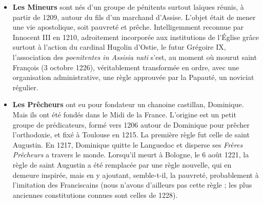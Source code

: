 \documentclass[french,twoside]{book} %
\begin{document}
\begin{itemize}[itemsep=0pt,]
\item {\bfseries Les Mineurs} sont nés d’un groupe de pénitents surtout laïques réunis, à partir de 1209, autour du fils d’un marchand d’Assise. L’objet était de mener une vie apostolique, soit pauvreté et prêche. Intelligemment reconnue par Innocent III en 1210, adroitement incorporée aux institutions de l’Église grâce surtout à l’action du cardinal Hugolin d’Ostie, le futur Grégoire IX, l’association des {\itshape poenitentes in Assisia nati} s’est, au moment où mourut saint François (3 octobre 1226), véritablement transformée en ordre, avec une organisation administrative, une règle approuvée par la Papauté, un noviciat régulier.
\item {\bfseries Les Prêcheurs} ont eu pour fondateur un chanoine castillan, Dominique. Mais ils ont été fondés dans le Midi de la France.  
\label{p111} L’origine est un petit groupe de prédicateurs, formé vers 1206 autour de Dominique pour prêcher l’orthodoxie, et fixé à Toulouse en 1215. La première règle fut celle de saint Augustin. En 1217, Dominique quitte le Languedoc et disperse ses \emph{Frères Prêcheurs} a travers le monde. Lorsqu’il meurt à Bologne, le 6 août 1221, la règle de saint Augustin a été remplacée par une règle nouvelle, qui en demeure inspirée, mais en y ajoutant, semble-t-il, la pauvreté, probablement à l’imitation des Franciscains (nous n’avons d’ailleurs pas cette règle ; les plus anciennes constitutions connues sont celles de 1228).
\end{itemize}
\end{document}
